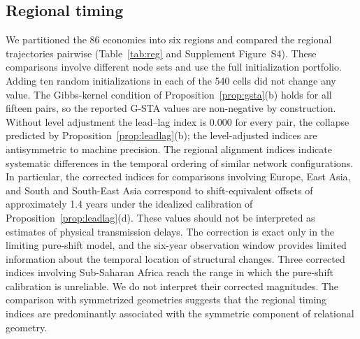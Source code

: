 \documentclass[12pt]{article}
\theoremstyle{definition}
\begin{document}
\subsection{Regional timing}

We partitioned the 86 economies into six regions and compared the regional trajectories pairwise (Table~\ref{tab:reg} and Supplement Figure~S4). These comparisons involve different node sets and use the full initialization portfolio. Adding ten random initializations in each of the 540 cells did not change any value. The Gibbs-kernel condition of Proposition~\ref{prop:gsta}(b) holds for all fifteen pairs, so the reported G-STA values are non-negative by construction. Without level adjustment the lead--lag index is $0.000$ for every pair, the collapse predicted by Proposition~\ref{prop:leadlag}(b); the level-adjusted indices are antisymmetric to machine precision. The regional alignment indices indicate systematic differences in the temporal ordering of similar network configurations. In particular, the corrected indices for comparisons involving Europe, East Asia, and South and South-East Asia correspond to shift-equivalent offsets of approximately 1.4 years under the idealized calibration of Proposition~\ref{prop:leadlag}(d).
These values should not be interpreted as estimates of physical transmission delays. The correction is exact only in the limiting pure-shift model, and the six-year observation window provides limited information about the temporal location of structural changes.
Three corrected indices involving Sub-Saharan Africa reach the range in which the pure-shift calibration is unreliable. We do not interpret their corrected magnitudes.
The comparison with symmetrized geometries suggests that the regional timing indices are predominantly associated with the symmetric component of relational geometry.
\end{document}

